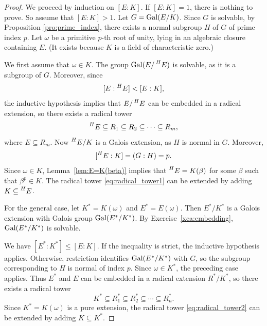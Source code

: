 \begin{proof}
    We proceed by induction on $[E:K]$. 
    If $[E:K]=1$, there is nothing to prove. 
    So assume that $[E:K]>1$. 
    Let $G=\operatorname{Gal}(E/K)$. Since $G$ is solvable, by Proposition \ref{pro:prime_index}, 
    there exists a normal subgroup $H$ of $G$ of prime index $p$. 
    Let $\omega$ be a primitive $p$-th root of unity, lying
    in an algebraic closure containing $E$. 
    (It exists because $K$ is a field of characteristic zero.)
    
    We first assume that $\omega\in K$. 
    The group $\operatorname{Gal}(E/\prescript{H}{}{E})$ is solvable, as it is a subgroup of $G$. Moreover, since 
    \[
    [E:\prescript{H}{}{E}]<[E:K],
    \]
    the inductive hypothesis implies that $E/\prescript{H}{}{E}$ can be embedded in a radical extension, so 
    there exists a radical tower
    \begin{equation}
    \label{eq:radical_tower1}
    \prescript{H}{}{E}\subseteq R_1\subseteq R_2\subseteq\cdots\subseteq R_m,
    \end{equation}
    where $E\subseteq R_m$. Now $\prescript{H}{}{E}/K$ is a Galois extension, as $H$ is normal in $G$. Moreover, 
    \[ 
    [\prescript{H}{}{E}:K]=(G:H)=p.
    \]
    Since $\omega\in K$, Lemma~\ref{lem:E=K(beta)} implies that 
    $\prescript{H}{}{E}=K(\beta)$ for some $\beta$ such that $\beta^p\in K$. The radical tower \ref{eq:radical_tower1} can be 
    extended by adding $K\subseteq \prescript{H}{}{E}$. 

    For the general case, let $K^*=K(\omega)$ and $E^*=E(\omega)$. Then $E^*/K^*$ is a Galois extension with Galois group 
    $\operatorname{Gal}(E^*/K^*)$. By Exercise~\ref{xca:embedding}, $\operatorname{Gal}(E^*/K^*)$ is solvable. 
    
    We have $[E^*:K^*]\leq[E:K]$. If the inequality is strict,
    the inductive hypothesis applies. Otherwise, restriction identifies
    $\operatorname{Gal}(E^*/K^*)$ with $G$, so the subgroup corresponding to $H$
    is normal of index $p$. Since $\omega\in K^*$, the preceding case applies. Thus 
    $E^*$ and $E$ can be embedded in a radical extension $R^*/K^*$, so there exists a radical tower
    \begin{equation}
    \label{eq:radical_tower2}
    K^*\subseteq R_1^*\subseteq R_2^*\subseteq\cdots\subseteq R_n^*.
    \end{equation}
    Since $K^*=K(\omega)$ is a pure extension, the radical tower \eqref{eq:radical_tower2} 
    can be extended by adding $K\subseteq K^*$. 
\end{proof}
